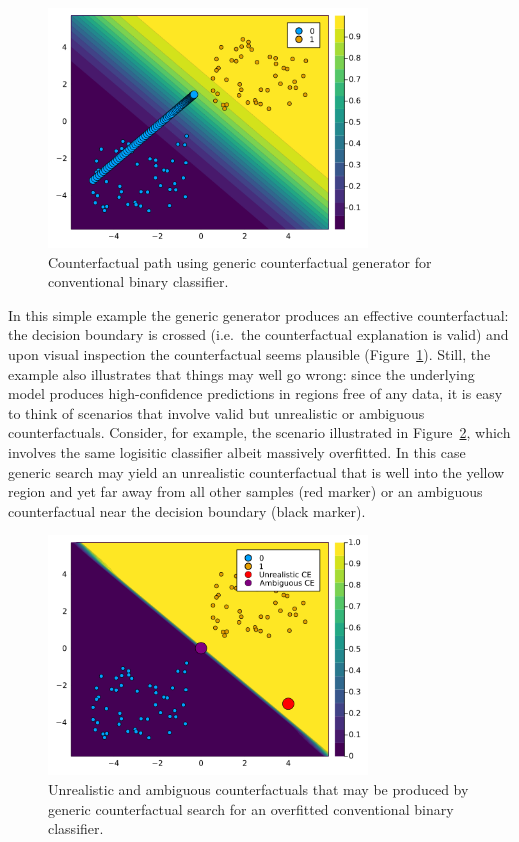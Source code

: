 \documentclass[
  letterpaper,
  DIV=11,
  numbers=noendperiod]{scrartcl}
\begin{document}
\begin{figure}

{\centering \includegraphics[width=3.33333in,height=2.5in]{www/ce_binary.png}

}

\caption{\label{fig-binary}Counterfactual path using generic
counterfactual generator for conventional binary classifier.}

\end{figure}

In this simple example the generic generator produces an effective
counterfactual: the decision boundary is crossed (i.e.~the
counterfactual explanation is valid) and upon visual inspection the
counterfactual seems plausible (Figure~\ref{fig-binary}). Still, the
example also illustrates that things may well go wrong: since the
underlying model produces high-confidence predictions in regions free of
any data, it is easy to think of scenarios that involve valid but
unrealistic or ambiguous counterfactuals. Consider, for example, the
scenario illustrated in Figure~\ref{fig-binary-wrong}, which involves
the same logisitic classifier albeit massively overfitted. In this case
generic search may yield an unrealistic counterfactual that is well into
the yellow region and yet far away from all other samples (red marker)
or an ambiguous counterfactual near the decision boundary (black
marker).

\begin{figure}

{\centering \includegraphics[width=3.33333in,height=2.5in]{www/binary_wrong.png}

}

\caption{\label{fig-binary-wrong}Unrealistic and ambiguous
counterfactuals that may be produced by generic counterfactual search
for an overfitted conventional binary classifier.}

\end{figure}
\end{document}
